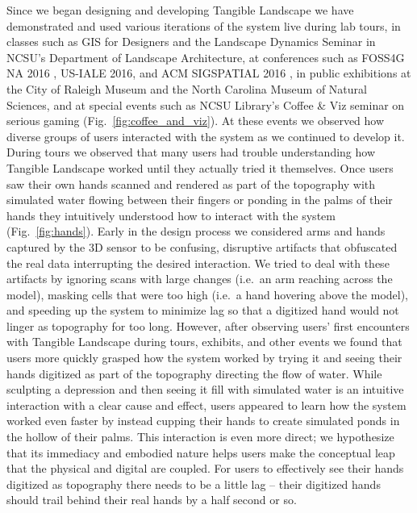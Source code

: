 \documentclass[prodmode,acmtochi]{acmsmall} %
\begin{document}
Since we began designing and developing Tangible Landscape 
we have demonstrated and used various iterations of the system live 
during lab tours,
in classes such as 
GIS for Designers and the Landscape Dynamics Seminar
in NCSU's Department of Landscape Architecture,  
at conferences such as
FOSS4G NA 2016 \cite{Petrasova2016a,Harmon2016e},
US-IALE 2016, 
and ACM SIGSPATIAL 2016 \cite{Tabrizian2016}, 
in public exhibitions at the City of Raleigh Museum and 
the North Carolina Museum of Natural Sciences,
and at special events 
such as NCSU Library's Coffee \& Viz seminar on serious gaming
\cite{Harmon2016d} (Fig.~\ref{fig:coffee_and_viz}). 
%
At these events
we observed how diverse groups of users 
interacted with the system
as we continued to develop it. 
%
During tours 
we observed that many users had trouble understanding 
how Tangible Landscape worked
until they actually tried it themselves. 
%
Once users saw their own hands scanned
and rendered as part of the topography
with simulated water flowing between their fingers
or ponding in the palms of their hands
they intuitively understood how to interact with the system
(Fig.~\ref{fig:hands}).
%
Early in the design process
we considered 
arms and hands captured by the 3D sensor
to be confusing, disruptive artifacts
that obfuscated the real data 
interrupting the desired interaction. 
%
We tried to deal with these artifacts
by ignoring scans with large changes
(i.e.~an arm reaching across the model), 
masking cells that were too high
(i.e.~a hand hovering above the model),
and speeding up the system to minimize lag
so that a digitized hand would not 
linger as topography for too long. 
%
However, 
after observing users' first encounters with Tangible Landscape 
during tours, exhibits, and other events
we found that users more quickly grasped
how the system worked 
by trying it and seeing their hands digitized
as part of the topography
directing the flow of water. 
%
While sculpting a depression 
and then seeing it fill with simulated water 
is an intuitive interaction with a clear cause and effect,
users appeared to learn how the system worked even faster 
by instead cupping their hands to create simulated ponds
in the hollow of their palms. 
%
This interaction is even more direct;
we hypothesize that its immediacy and embodied nature
helps users make the conceptual leap 
that the physical and digital are coupled. 
%
For users to effectively see their hands digitized as topography
there needs to be a little lag -- 
their digitized hands should trail behind their real hands
by a half second or so. 
\end{document}
